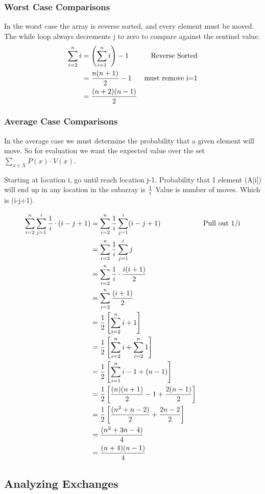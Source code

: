 \documentclass[english, 10pt]{article}
\begin{document}
\subsubsection{Worst Case Comparisons}
In the worst case the array is reverse sorted, and every element must be moved.
The while loop always decrements j to zero to compare against the sentinel value.
\begin{align*}
    \sum_{i=2}^n i &= \left(\sum_{i=1}^{n}i \right)-1 & \text{Reverse Sorted} \\
    &= \frac{n(n+1)}{2} -1 & \text{must remove i=1} \\
    &= \frac{(n+2)(n-1)}{2}
\end{align*}

\subsubsection{Average Case Comparisons}
In the average case we must determine the probability that a given element will move.
So for evaluation we want the expected value over the set $\sum_{x \in X} P(x)\cdot V(x) $.

Starting at location i, go until reach location j-1.
Probability that 1 element (A[i]) will end up in any location in the subarray is $\frac{1}{i}$
Value is number of moves. Which is (i-j+1).

\begin{align*}
    \sum_{i=2}^{n} \sum_{j=1}^{i} \frac{1}{i} \cdot (i-j+1) &= \sum_{i=2}^{n} \frac{1}{i} \sum_{j=1}^{i} (i-j+1)  &  \text{Pull out 1/i} \\
 &= \sum_{i=2}^{n}\frac{1}{i}\sum_{j=1}^{i} j \\
 &= \sum_{i=2}^{n}\frac{1}{i}\cdot\frac{i(i+1)}{2} \\
 &= \sum_{i=2}^{n}\frac{(i+1)}{2} \\
 &= \frac{1}{2}\left[ \sum_{i=2}^{n}i+1\right] \\
 &= \frac{1}{2}\left[ \sum_{i=2}^{n}i+ \sum_{i=2}^{n}1\right] \\
 &= \frac{1}{2}\left[ \sum_{i=1}^{n}i -1 + (n-1) \right] \\
 &= \frac{1}{2}\left[ \frac{(n)(n+1)}{2} -1 + \frac{2(n-1)}{2} \right] \\
 &= \frac{1}{2}\left[ \frac{(n^2+n-2)}{2} + \frac{2n-2}{2} \right] \\
 &= \frac{(n^2+3n-4)}{4}  \\
 &= \frac{(n+4) (n-1)}{4}
\end{align*}


\subsection{Analyzing Exchanges}
\end{document}
